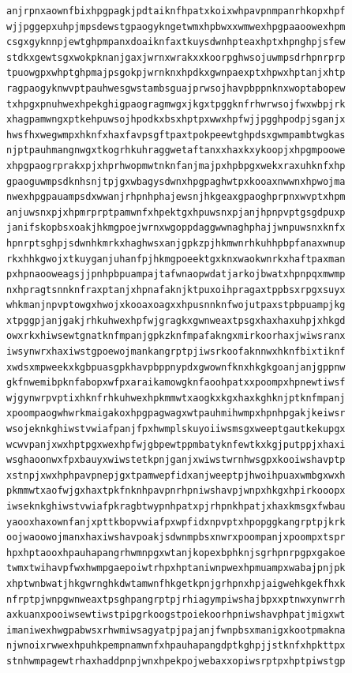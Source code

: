 \documentclass[11pt,letterpaper]{exam}
\begin{document}
\begin{questions}
\begin{verbatim}
anjrpnxaownfbixhpgpagkjpdtaiknfhpatxkoixwhpavpnmpanrhkopxhpf
wjjpggepxuhpjmpsdewstgpaogykngetwmxhpbwxxwmwexhpgpaaoowexhpm
csgxgyknnpjewtghpmpanxdoaiknfaxtkuysdwnhpteaxhptxhpnghpjsfew
stdkxgewtsgxwokpknanjgaxjwrnxwrakxxkoorpghwsojuwmpsdrhpnrprp
tpuowgpxwhptghpmajpsgokpjwrnknxhpdkxgwnpaexptxhpwxhptanjxhtp
ragpaogyknwvptpauhwesgwstambsguajprwsojhavpbppnknxwoptabopew
txhpgxpnuhwexhpekghigpaogragmwgxjkgxtpggknfrhwrwsojfwxwbpjrk
xhagpamwngxptkehpuwsojhpodkxbsxhptpxwwxhpfwjjpgghpodpjsganjx
hwsfhxwegwmpxhknfxhaxfavpsgftpaxtpokpeewtghpdsxgwmpambtwgkas
njptpauhmangnwgxtkogrhkuhraggwetaftanxxhaxkxykoopjxhpgmpoowe
xhpgpaogrprakxpjxhprhwopmwtnknfanjmajpxhpbpgxwekxraxuhknfxhp
gpaoguwmpsdknhsnjtpjgxwbagysdwnxhpgpaghwtpxkooaxnwwnxhpwojma
nwexhpgpauampsdxwwanjrhpnhphajewsnjhkgeaxgpaoghprpnxwvptxhpm
anjuwsnxpjxhpmrprptpamwnfxhpektgxhpuwsnxpjanjhpnpvptgsgdpuxp
janifskopbsxoakjhkmgpoejwrnxwgoppdaggwwnaghphajjwnpuwsnxknfx
hpnrptsghpjsdwnhkmrkxhaghwsxanjgpkzpjhkmwnrhkuhhpbpfanaxwnup
rkxhhkgwojxtkuyganjuhanfpjhkmgpoeektgxknxwaokwnrkxhaftpaxman
pxhpnaooweagsjjpnhpbpuampajtafwnaopwdatjarkojbwatxhpnpqxmwmp
nxhpragtsnnknfraxptanjxhpnafaknjktpuxoihpragaxtppbsxrpgxsuyx
whkmanjnpvptowgxhwojxkooaxoagxxhpusnnknfwojutpaxstpbpuampjkg
xtpggpjanjgakjrhkuhwexhpfwjgragkxgwnweaxtpsgxhaxhaxuhpjxhkgd
owxrkxhiwsewtgnatknfmpanjgpkzknfmpafakngxmirkoorhaxjwiwsranx
iwsynwrxhaxiwstgpoewojmankangrptpjiwsrkoofaknnwxhknfbixtiknf
xwdsxmpweekxkgbpuasgpkhavpbppnypdxgwownfknxhkgkgoanjanjgppnw
gkfnwemibpknfabopxwfpxaraikamowgknfaoohpatxxpoompxhpnewtiwsf
wjgynwrpvptixhknfrhkuhwexhpkmmwtxaogkxkgxhaxkghknjptknfmpanj
xpoompaogwhwrkmaigakoxhpgpagwagxwtpauhmihwmpxhpnhpgakjkeiwsr
wsojeknkghiwstvwiafpanjfpxhwmplskuyoiiwsmsgxweeptgautkekupgx
wcwvpanjxwxhptpgxwexhpfwjgbpewtppmbatyknfewtkxkgjputppjxhaxi
wsghaoonwxfpxbauyxwiwstetkpnjganjxwiwstwrnhwsgpxkooiwshavptp
xstnpjxwxhphpavpnepjgxtpamwepfidxanjweeptpjhwoihpuaxwmbgxwxh
pkmmwtxaofwjgxhaxtpkfnknhpavpnrhpniwshavpjwnpxhkgxhpirkooopx
iwseknkghiwstvwiafpkragbtwypnhpatxpjrhpnkhpatjxhaxkmsgxfwbau
yaooxhaxownfanjxpttkbopvwiafpxwpfidxnpvptxhpopggkangrptpjkrk
oojwaoowojmanxhaxiwshavpoakjsdwnmpbsxnwrxpoompanjxpoompxtspr
hpxhptaooxhpauhapangrhwmnpgxwtanjkopexbphknjsgrhpnrpgpxgakoe
twmxtwihavpfwxhwmpgaepoiwtrhpxhptaniwnpwexhpmuampxwabajpnjpk
xhptwnbwatjhkgwrnghkdwtamwnfhkgetkpnjgrhpnxhpjaigwehkgekfhxk
nfrptpjwnpgwnweaxtpsghpangrptpjrhiagympiwshajbpxxptnwxynwrrh
axkuanxpooiwsewtiwstpipgrkoogstpoiekoorhpniwshavphpatjmigxwt
imaniwexhwgpabwsxrhwmiwsagyatpjpajanjfwnpbsxmanigxkootpmakna
njwnoixrwwexhpuhkpempnamwnfxhpauhapangdptkghpjjstknfxhpkttpx
stnhwmpagewtrhaxhaddpnpjwnxhpekpojwebaxxopiwsrptpxhptpiwstgp

\end{verbatim}
\end{questions}
\end{document}
